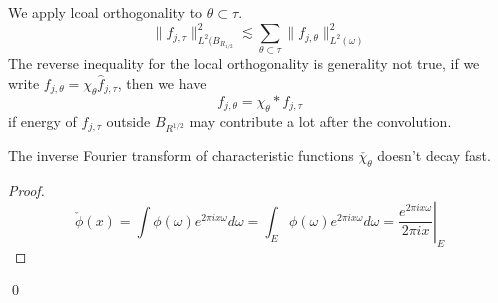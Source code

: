 We apply lcoal orthogonality to $\theta\subset\tau$. 
\begin{equation*}
    \|f_{j,\tau}\|_{L^2(B_{R_{1/2}}}^2\lesssim \sum_{\theta\subset\tau}\|f_{j,\theta}\|_{L^2(\omega)}^2
\end{equation*}
The reverse inequality for the local orthogonality is generality not true, if we write $f_{j,\theta}=\chi_\theta\widehat{f}_{j,\tau}$, then we have
\begin{equation*}
    f_{j,\theta}=\chi_\theta\ast f_{j,\tau}
\end{equation*}
if energy of $f_{j,\tau}$ outside $B_{R^{1/2}}$ may contribute a lot after the convolution. 
\begin{proposition}
    The inverse Fourier transform of characteristic functions $\check{\chi_\theta}$ doesn't decay fast. 
\end{proposition}
\begin{proof}
\begin{equation*}
    \check{\phi}(x)=\int\phi(\omega)e^{2\pi ix\omega}d\omega=\int_E\phi(\omega)e^{2\pi ix\omega}d\omega=\left.\frac{e^{2\pi ix\omega}}{2\pi ix}\right\vert_E
\end{equation*}
\end{proof}
\qed



